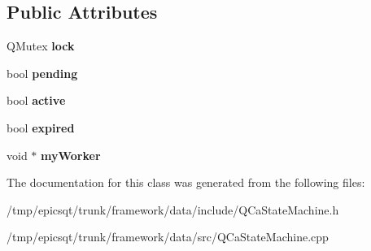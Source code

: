 \subsection*{Public Attributes}
\begin{DoxyCompactItemize}
\item 
\hypertarget{classqcastatemachine_1_1QCaStateMachine_a106df214a6d9f78451dd66c91b439282}{
QMutex {\bfseries lock}}
\label{classqcastatemachine_1_1QCaStateMachine_a106df214a6d9f78451dd66c91b439282}

\item 
\hypertarget{classqcastatemachine_1_1QCaStateMachine_a3cd8bd35a1a5eb8d8544ddeaa863719f}{
bool {\bfseries pending}}
\label{classqcastatemachine_1_1QCaStateMachine_a3cd8bd35a1a5eb8d8544ddeaa863719f}

\item 
\hypertarget{classqcastatemachine_1_1QCaStateMachine_a05e84eff9551dcec8605ae85c6614637}{
bool {\bfseries active}}
\label{classqcastatemachine_1_1QCaStateMachine_a05e84eff9551dcec8605ae85c6614637}

\item 
\hypertarget{classqcastatemachine_1_1QCaStateMachine_af59c8eea6dee54d359e5b14f82335a1b}{
bool {\bfseries expired}}
\label{classqcastatemachine_1_1QCaStateMachine_af59c8eea6dee54d359e5b14f82335a1b}

\item 
\hypertarget{classqcastatemachine_1_1QCaStateMachine_a5924b3d66452357d2637397b43a1ecc2}{
void $\ast$ {\bfseries myWorker}}
\label{classqcastatemachine_1_1QCaStateMachine_a5924b3d66452357d2637397b43a1ecc2}

\end{DoxyCompactItemize}


The documentation for this class was generated from the following files:\begin{DoxyCompactItemize}
\item 
/tmp/epicsqt/trunk/framework/data/include/QCaStateMachine.h\item 
/tmp/epicsqt/trunk/framework/data/src/QCaStateMachine.cpp\end{DoxyCompactItemize}
